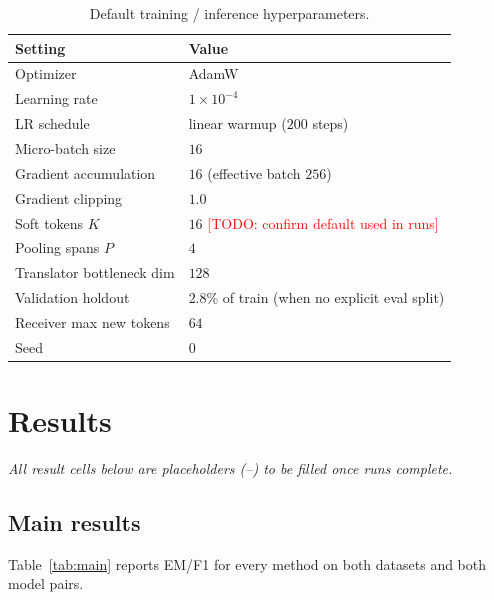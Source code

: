 \documentclass[11pt]{article}
\newcommand{\TODO}[1]{\textcolor{red}{[TODO: #1]}}
\newcommand{\res}{--}                             %
\begin{document}
\begin{table}[h]
  \centering
  \caption{Default training / inference hyperparameters.}
  \label{tab:hparams}
  \begin{tabular}{ll}
    \toprule
    Setting & Value \\
    \midrule
    Optimizer & AdamW \\
    Learning rate & $1\times10^{-4}$ \\
    LR schedule & linear warmup ($200$ steps) \\
    Micro-batch size & $16$ \\
    Gradient accumulation & $16$ (effective batch $256$) \\
    Gradient clipping & $1.0$ \\
    Soft tokens $K$ & $16$ \TODO{confirm default used in runs} \\
    Pooling spans $P$ & $4$ \\
    Translator bottleneck dim & $128$ \\
    Validation holdout & $2.8\%$ of train (when no explicit eval split) \\
    Receiver max new tokens & $64$ \\
    Seed & $0$ \\
    \bottomrule
  \end{tabular}
\end{table}

\section{Results}\label{sec:results}
\noindent\emph{All result cells below are placeholders (\res) to be filled once
runs complete.}

\subsection{Main results}
Table~\ref{tab:main} reports EM/F1 for every method on both datasets and both
model pairs.
\end{document}
